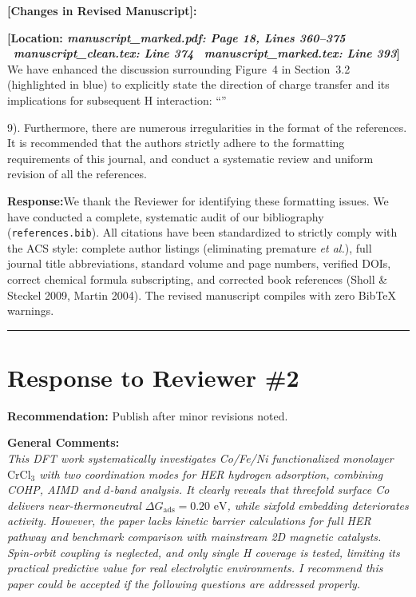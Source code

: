\documentclass[11pt, sans, a4paper]{moderncv}
\newcommand{\response}{\vspace{0.4em}\noindent\textbf{\color{actionblue}Response:}\hspace{0.5em}}
\newcommand{\manuscriptchange}[1]{\vspace{0.4em}\noindent\textbf{\color{acsblue}[Changes in Revised Manuscript]:}\par\nopagebreak\vspace{0.15em}#1\vspace{0.4em}}
\begin{document}
\manuscriptchange{\textbf{[Location: \textit{manuscript\_marked.pdf: Page 18, Lines 360--375} \textbar\ \textit{manuscript\_clean.tex: Line 374} \textbar\ \textit{manuscript\_marked.tex: Line 393}]}\\ We have enhanced the discussion surrounding Figure~4 in Section~3.2 (highlighted in blue) to explicitly state the direction of charge transfer and its implications for subsequent H interaction: ``{\itshape \ExecuteMetaData[manuscript_marked.tex]{BaderChargeTransfer}}''}

\vspace{0.8em}

\begin{reviewercomment}
9). Furthermore, there are numerous irregularities in the format of the references. It is recommended that the authors strictly adhere to the formatting requirements of this journal, and conduct a systematic review and uniform revision of all the references.
\end{reviewercomment}

\response We thank the Reviewer for identifying these formatting issues. We have conducted a complete, systematic audit of our bibliography (\texttt{references.bib}). All citations have been standardized to strictly comply with the ACS style: complete author listings (eliminating premature \textit{et al.}), full journal title abbreviations, standard volume and page numbers, verified DOIs, correct chemical formula subscripting, and corrected book references (Sholl \& Steckel 2009, Martin 2004). The revised manuscript compiles with zero BibTeX warnings.

\vspace{1.5em}
\noindent\rule{\textwidth}{0.6pt}

\newpage

\section{Response to Reviewer \#2}

\noindent\textbf{Recommendation:} Publish after minor revisions noted.

\vspace{0.5em}
\noindent\textbf{General Comments:}\\
\textit{This DFT work systematically investigates Co/Fe/Ni functionalized monolayer $\text{CrCl}_3$ with two coordination modes for HER hydrogen adsorption, combining COHP, AIMD and $d$-band analysis. It clearly reveals that threefold surface Co delivers near-thermoneutral $\Delta G_{\mathrm{ads}}=0.20\text{ eV}$, while sixfold embedding deteriorates activity. However, the paper lacks kinetic barrier calculations for full HER pathway and benchmark comparison with mainstream 2D magnetic catalysts. Spin-orbit coupling is neglected, and only single H coverage is tested, limiting its practical predictive value for real electrolytic environments. I recommend this paper could be accepted if the following questions are addressed properly.}
\end{document}
